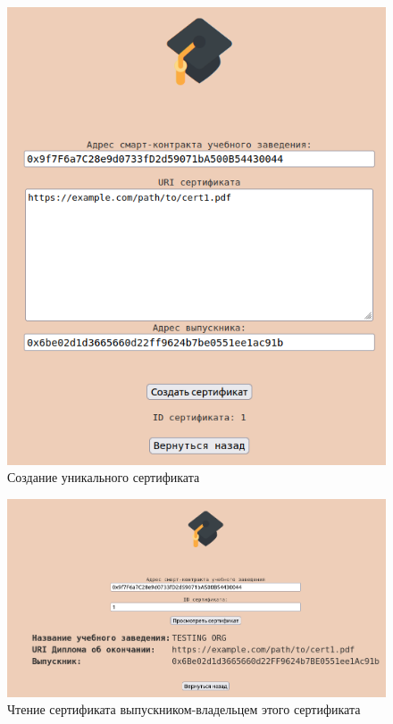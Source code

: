 \begin{figure}[h!]
	\centering
	\includegraphics[width=\textwidth]{img/cert_created.png}
	\caption{Создание уникального сертификата}
	\label{fig:a10}
\end{figure}

\begin{figure}[h!]
	\centering
	\includegraphics[width=\textwidth]{img/cert_seen.png}
	\caption{Чтение сертификата выпускником-владельцем этого сертификата}
	\label{fig:a11}
\end{figure}

